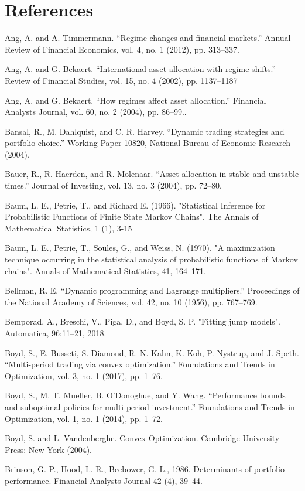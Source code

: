 \newpage
\section{References}

Ang, A. and A. Timmermann. “Regime changes and financial markets.” Annual Review of Financial Economics, vol. 4, no. 1 (2012), pp. 313–337.

Ang, A. and G. Bekaert. “International asset allocation with regime shifts.” Review of Financial Studies, vol. 15, no. 4 (2002), pp. 1137–1187

Ang, A. and G. Bekaert. “How regimes affect asset allocation.” Financial Analysts Journal, vol. 60, no. 2 (2004), pp. 86–99..

Bansal, R., M. Dahlquist, and C. R. Harvey. “Dynamic trading strategies and portfolio choice.” Working Paper 10820, National Bureau of Economic Research (2004).

Bauer, R., R. Haerden, and R. Molenaar. “Asset allocation in stable and unstable times.” Journal of Investing, vol. 13, no. 3 (2004), pp. 72–80.


Baum, L. E., Petrie, T., and Richard E. (1966). "Statistical Inference for Probabilistic Functions of Finite State Markov Chains". The Annals of Mathematical Statistics, 1 (1), 3-15

Baum, L. E., Petrie, T., Soules, G., and Weiss, N. (1970). "A maximization technique occurring in the
statistical analysis of probabilistic functions of Markov chains". Annals of Mathematical Statistics, 41, 164–171.

Bellman, R. E. “Dynamic programming and Lagrange multipliers.” Proceedings of the National Academy of Sciences, vol. 42, no. 10 (1956), pp. 767–769.

Bemporad, A., Breschi, V., Piga, D., and Boyd, S. P. "Fitting jump models". Automatica, 96:11–21, 2018.

Boyd, S., E. Busseti, S. Diamond, R. N. Kahn, K. Koh, P. Nystrup, and J. Speth. “Multi-period trading via convex optimization.” Foundations and Trends in Optimization, vol. 3, no. 1 (2017), pp. 1–76.

Boyd, S., M. T. Mueller, B. O’Donoghue, and Y. Wang. “Performance bounds and suboptimal policies for multi-period investment.” Foundations and Trends in Optimization, vol. 1, no. 1 (2014), pp. 1–72.

Boyd, S. and L. Vandenberghe. Convex Optimization. Cambridge University Press: New York (2004).

Brinson, G. P., Hood, L. R., Beebower, G. L., 1986. Determinants of portfolio performance. Financial Analysts Journal 42 (4), 39–44.

